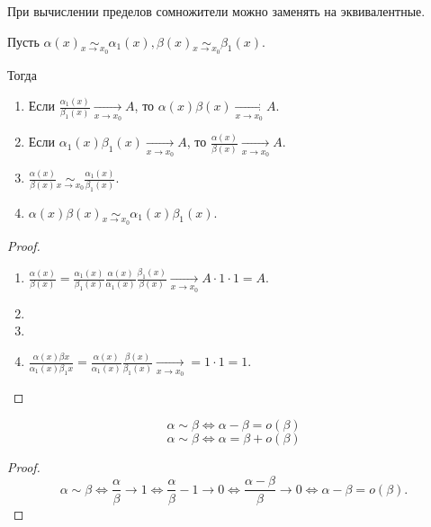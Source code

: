 \begin{Theorem}
При вычислении пределов сомножители можно заменять на эквивалентные.

Пусть $\alpha(x) \underset{x \rightarrow x_0}{\sim} \alpha_1(x), \beta(x) \underset{x \rightarrow x_0}{\sim} \beta_1(x)$.

Тогда
\begin{enumerate}
  \item Если $\frac{\alpha_1(x)}{\beta_1(x)} \xrightarrow[x \rightarrow x_0]{} A$, то $\alpha(x)\beta(x) \xrightarrow[x \rightarrow x_0]{} A$.
  \item Если $\alpha_1(x) \beta_1(x) \xrightarrow[x \rightarrow x_0]{} A$, то $\frac{\alpha(x)}{\beta(x)} \xrightarrow[x \rightarrow x_0]{} A$.
  \item $\frac{\alpha(x)}{\beta(x)} \underset{x \rightarrow x_0}{\sim} \frac{\alpha_1(x)}{\beta_1(x)}$.
  \item $\alpha(x) \beta(x) \underset{x \rightarrow x_0}{\sim} \alpha_1(x) \beta_1(x)$.
\end{enumerate}
\end{Theorem}

\begin{proof}
\begin{enumerate}
  \item $\frac{\alpha(x)}{\beta(x)} = \frac{\alpha_1(x)}{\beta_1(x)} \frac{\alpha(x)}{\alpha_1(x)} \frac{\beta_1(x)}{\beta(x)} \xrightarrow[x \rightarrow x_0]{} A \cdot 1 \cdot 1 = A$.
  \item
  \item
  \item $\frac{\alpha(x) \beta{x}}{\alpha_1(x) \beta_1{x}} = \frac{\alpha(x)}{\alpha_1(x)} \frac{\beta(x)}{\beta_1(x)} \xrightarrow[x \rightarrow x_0]{} = 1 \cdot 1 = 1.$
\end{enumerate}
\end{proof}

\begin{Theorem}
$$\alpha \sim \beta \Leftrightarrow \alpha - \beta = o(\beta)$$
$$\alpha \sim \beta \Leftrightarrow \alpha = \beta + o(\beta)$$
\end{Theorem}

\begin{proof}
$$\alpha \sim \beta \Leftrightarrow \frac{\alpha}{\beta} \rightarrow 1 \Leftrightarrow \frac{\alpha}{\beta} - 1 \rightarrow 0 \Leftrightarrow \frac{\alpha - \beta}{\beta} \rightarrow 0 \Leftrightarrow \alpha - \beta = o(\beta).$$
\end{proof}


